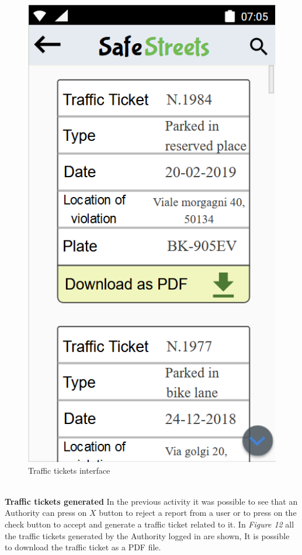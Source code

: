     \begin{figure}[h]
        \centering
        \includegraphics[scale=0.68]{Images/traffic_ticket.png}
        \caption{Traffic tickets interface}
    \end{figure}\newline\\
    \textbf{Traffic tickets generated}\newline
    In the previous activity it was possible to see that an Authority can press on $X$ button to reject a report from a user or to press on the check button to accept and  generate a traffic ticket related to it. In \textit{Figure 12} all the traffic tickets generated by the Authority logged in are shown, It is possible to download the traffic ticket as a PDF file.
